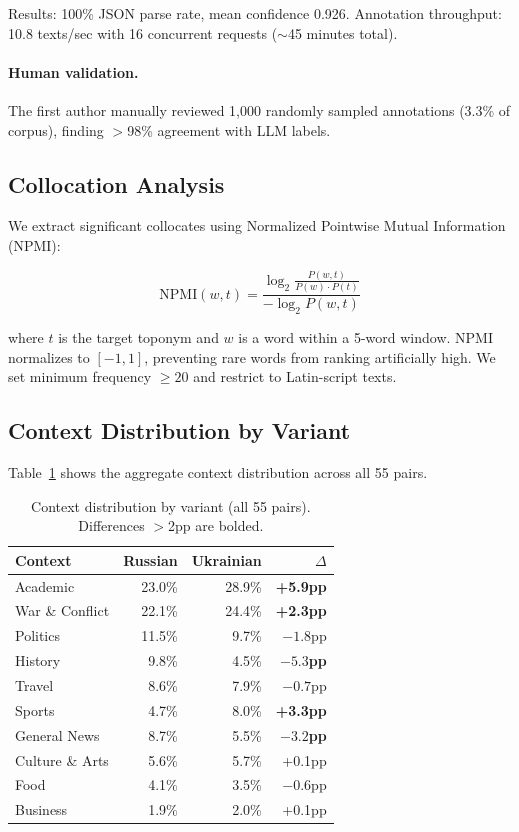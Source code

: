 \documentclass{article}
\begin{document}
Results: 100\% JSON parse rate, mean confidence 0.926. Annotation throughput: 10.8 texts/sec with 16 concurrent requests ($\sim$45 minutes total).

\paragraph{Human validation.} The first author manually reviewed 1,000 randomly sampled annotations (3.3\% of corpus), finding $>$98\% agreement with LLM labels.

\subsection{Collocation Analysis}

We extract significant collocates using Normalized Pointwise Mutual Information (NPMI):

\begin{equation}
\text{NPMI}(w, t) = \frac{\log_2 \frac{P(w, t)}{P(w) \cdot P(t)}}{-\log_2 P(w, t)}
\label{eq:npmi}
\end{equation}

where $t$ is the target toponym and $w$ is a word within a 5-word window. NPMI normalizes to $[-1, 1]$, preventing rare words from ranking artificially high. We set minimum frequency $\geq 20$ and restrict to Latin-script texts.

\subsection{Context Distribution by Variant}

Table~\ref{tab:context-variant} shows the aggregate context distribution across all 55 pairs.

\begin{table}[t]
\centering
\small
\caption{Context distribution by variant (all 55 pairs). Differences $>$2pp are bolded.}
\label{tab:context-variant}
\begin{tabular}{lrrr}
\toprule
\textbf{Context} & \textbf{Russian} & \textbf{Ukrainian} & \textbf{$\Delta$} \\
\midrule
Academic & 23.0\% & 28.9\% & \textbf{+5.9pp} \\
War \& Conflict & 22.1\% & 24.4\% & \textbf{+2.3pp} \\
Politics & 11.5\% & 9.7\% & $-1.8$pp \\
History & 9.8\% & 4.5\% & \textbf{$-5.3$pp} \\
Travel & 8.6\% & 7.9\% & $-0.7$pp \\
Sports & 4.7\% & 8.0\% & \textbf{+3.3pp} \\
General News & 8.7\% & 5.5\% & \textbf{$-3.2$pp} \\
Culture \& Arts & 5.6\% & 5.7\% & +0.1pp \\
Food & 4.1\% & 3.5\% & $-0.6$pp \\
Business & 1.9\% & 2.0\% & +0.1pp \\
\bottomrule
\end{tabular}
\end{table}
\end{document}
